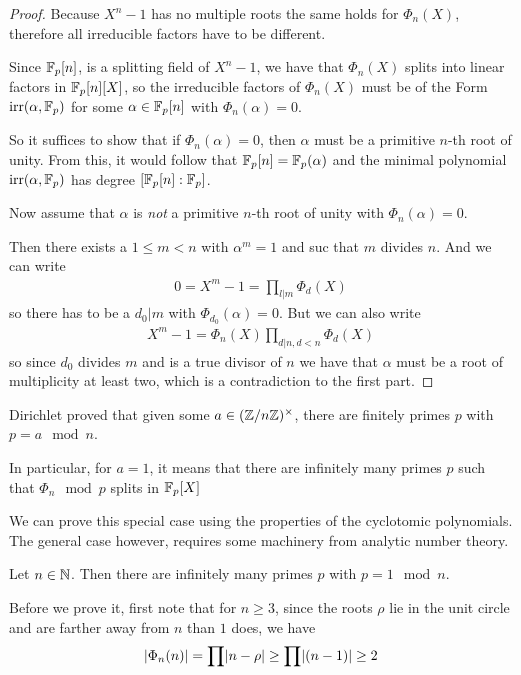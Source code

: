 \begin{proof}
  Because $X^{n} -1$ has no multiple roots the same holds for $\Phi_n(X)$, therefore all irreducible factors have to be different.

  Since $\mathbb{F}_p[n]$, is a splitting field of $X^{n}-1$, we have that $\Phi_n(X)$ splits into linear factors in $\mathbb{F}_p[n][X]$, so the irreducible factors of $\Phi_n(X)$ must be of the Form $\text{irr}(\alpha,\mathbb{F}_p)$ for some $\alpha \in \mathbb{F}_p[n]$ with $\Phi_n(\alpha) = 0$.

  So it suffices to show that if $\Phi_n(\alpha) = 0$, then $\alpha$ must be a primitive $n$-th root of unity.
  From this, it would follow that $\mathbb{F}_p[n] = \mathbb{F}_p(\alpha)$ and the minimal polynomial $\text{irr}(\alpha,\mathbb{F}_p)$ has degree $[\mathbb{F}_p[n] : \mathbb{F}_p]$.

  Now assume that $\alpha$ is \emph{not} a primitive $n$-th root of unity with $\Phi_n(\alpha) = 0$.

  Then there exists a $1 \leq m <n$ with $\alpha^{m} = 1$ and suc that $m$ divides $n$.
  And we can write
  \begin{align*}
    0 = X^{m} - 1 = \prod_{l | m} \Phi_d(X) 
  \end{align*}
  so there has to be a $d_0 | m$ with $\Phi_{d_0}(\alpha) = 0$.
  But we can also write
  \begin{align*}
    X^{m} -1 = \Phi_n(X) \prod_{d|n, d < n} \Phi_d(X)
  \end{align*}
  so since $d_0$ divides $m$ and is a true divisor of $n$ we have that $\alpha$ must be a root of multiplicity at least two, which is a contradiction to the first part.
\end{proof}


Dirichlet proved that given some $a \in (\mathbb{Z}/n\mathbb{Z})^{\times}$, there are finitely primes $p$ with $p = a \mod n$.

In particular, for $a = 1$, it means that there are infinitely many primes $p$ such that
$\Phi_n \mod p$ splits in $\mathbb{F}_p[X]$



We can prove this special case using the properties of the cyclotomic polynomials.
The general case however, requires some machinery from analytic number theory.

\begin{thm}[]
Let $n \in \mathbb{N}$. Then there are infinitely many primes $p$ with $p = 1 \mod n$.
\end{thm}
Before we prove it, first note that for $n \geq 3$, since the roots $\rho$ lie in the unit circle and are farther away from $n$ than $1$ does, we have
\begin{align*}
\abs{\Phi_n(n)} = \prod \abs{n - \rho} \geq \prod \abs{(n-1)} \geq 2
\end{align*}


